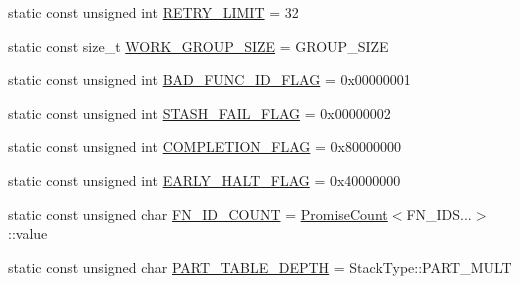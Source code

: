 \begin{DoxyCompactItemize}
\item 
static const unsigned int \hyperlink{structHarmonizeProgram_3_01PromiseUnion_3_01FN__IDS_8_8_8_4_00	PROGRAM__STATE_00	ADR__TYPE_00	ST96305cc1a177b714bc64a5044f46c97c_a0ca2f6bf9bdf74c470e55aeea4811f2e}{R\-E\-T\-R\-Y\-\_\-\-L\-I\-M\-I\-T} = 32
\item 
static const size\-\_\-t \hyperlink{structHarmonizeProgram_3_01PromiseUnion_3_01FN__IDS_8_8_8_4_00	PROGRAM__STATE_00	ADR__TYPE_00	ST96305cc1a177b714bc64a5044f46c97c_a95c316270ade6c0e17ef01c26e34d6dc}{W\-O\-R\-K\-\_\-\-G\-R\-O\-U\-P\-\_\-\-S\-I\-Z\-E} = G\-R\-O\-U\-P\-\_\-\-S\-I\-Z\-E
\item 
static const unsigned int \hyperlink{structHarmonizeProgram_3_01PromiseUnion_3_01FN__IDS_8_8_8_4_00	PROGRAM__STATE_00	ADR__TYPE_00	ST96305cc1a177b714bc64a5044f46c97c_ad145e637de96ea4c9991c6e8ba2d223c}{B\-A\-D\-\_\-\-F\-U\-N\-C\-\_\-\-I\-D\-\_\-\-F\-L\-A\-G} = 0x00000001
\item 
static const unsigned int \hyperlink{structHarmonizeProgram_3_01PromiseUnion_3_01FN__IDS_8_8_8_4_00	PROGRAM__STATE_00	ADR__TYPE_00	ST96305cc1a177b714bc64a5044f46c97c_a72e74c09cb889833ca820da3973404b4}{S\-T\-A\-S\-H\-\_\-\-F\-A\-I\-L\-\_\-\-F\-L\-A\-G} = 0x00000002
\item 
static const unsigned int \hyperlink{structHarmonizeProgram_3_01PromiseUnion_3_01FN__IDS_8_8_8_4_00	PROGRAM__STATE_00	ADR__TYPE_00	ST96305cc1a177b714bc64a5044f46c97c_a7f1a725617fff60173892fcfd137e851}{C\-O\-M\-P\-L\-E\-T\-I\-O\-N\-\_\-\-F\-L\-A\-G} = 0x80000000
\item 
static const unsigned int \hyperlink{structHarmonizeProgram_3_01PromiseUnion_3_01FN__IDS_8_8_8_4_00	PROGRAM__STATE_00	ADR__TYPE_00	ST96305cc1a177b714bc64a5044f46c97c_aa36166eb26ba911b49a702ed47391b9a}{E\-A\-R\-L\-Y\-\_\-\-H\-A\-L\-T\-\_\-\-F\-L\-A\-G} = 0x40000000
\item 
static const unsigned char \hyperlink{structHarmonizeProgram_3_01PromiseUnion_3_01FN__IDS_8_8_8_4_00	PROGRAM__STATE_00	ADR__TYPE_00	ST96305cc1a177b714bc64a5044f46c97c_a65d8dc32f58986606647fbe2132fe9cd}{F\-N\-\_\-\-I\-D\-\_\-\-C\-O\-U\-N\-T} = \hyperlink{structPromiseCount}{Promise\-Count}$<$F\-N\-\_\-\-I\-D\-S...$>$\-::value
\item 
static const unsigned char \hyperlink{structHarmonizeProgram_3_01PromiseUnion_3_01FN__IDS_8_8_8_4_00	PROGRAM__STATE_00	ADR__TYPE_00	ST96305cc1a177b714bc64a5044f46c97c_a39ee806efb203bec096738c0c78d4202}{P\-A\-R\-T\-\_\-\-T\-A\-B\-L\-E\-\_\-\-D\-E\-P\-T\-H} = Stack\-Type\-::\-P\-A\-R\-T\-\_\-\-M\-U\-L\-T

\end{DoxyCompactItemize}
